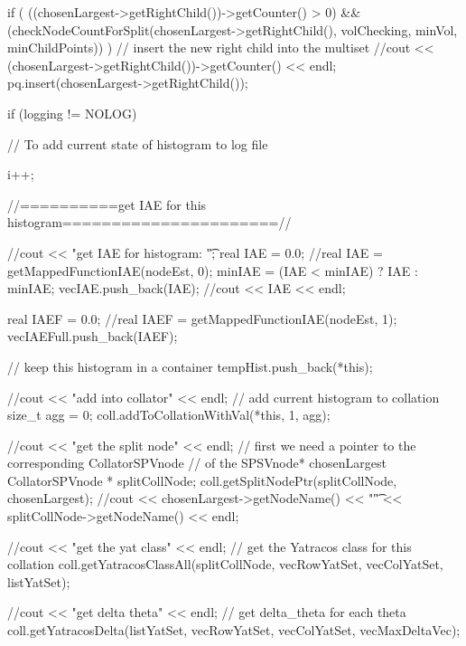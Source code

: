 \begin{DoxyCode}
{{{            if ( ((chosenLargest->getRightChild())->getCounter() > 0) 
            && (checkNodeCountForSplit(chosenLargest->getRightChild(),
                    volChecking, minVol, minChildPoints)) ) {
                // insert the new right child into the multiset
               //cout << (chosenLargest->getRightChild())->getCounter()  <<
       endl;
                pq.insert(chosenLargest->getRightChild());
            }

            if (logging != NOLOG) {
                // To add current state of histogram to log file               
          
                i++;
            }

          //==========get IAE for this histogram======================//
         
        //cout << "get IAE for histogram: \t";
        real IAE = 0.0;
        //real IAE = getMappedFunctionIAE(nodeEst, 0);
        minIAE = (IAE < minIAE) ? IAE : minIAE;
        vecIAE.push_back(IAE); 
        //cout << IAE << endl;
        
        real IAEF = 0.0;
        //real IAEF = getMappedFunctionIAE(nodeEst, 1);
        vecIAEFull.push_back(IAEF); 

        // keep this histogram in a container 
        tempHist.push_back(*this);
        
        //cout << "add into collator" << endl;
        // add current histogram to collation
        size_t agg = 0;
        coll.addToCollationWithVal(*this, 1, agg);
          
        //cout << "get the split node" << endl;
        // first we need a pointer to the corresponding CollatorSPVnode 
        // of the SPSVnode* chosenLargest     
        CollatorSPVnode * splitCollNode;
        coll.getSplitNodePtr(splitCollNode, chosenLargest);
        //cout << chosenLargest->getNodeName() << "\t" <<
       splitCollNode->getNodeName() << endl;
        
        //cout << "get the yat class" << endl;
        // get the Yatracos class for this collation
        coll.getYatracosClassAll(splitCollNode, vecRowYatSet,
                            vecColYatSet, listYatSet);

        //cout << "get delta theta" << endl;
        // get delta_theta for each theta
        coll.getYatracosDelta(listYatSet, vecRowYatSet, vecColYatSet, 
                        vecMaxDeltaVec);

}}}
\end{DoxyCode}
